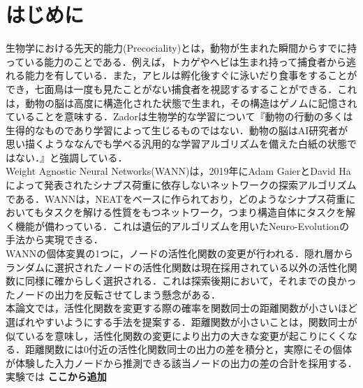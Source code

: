 \section{はじめに}
生物学における先天的能力(Precociality)とは，動物が生まれた瞬間からすでに持っている能力のことである．例えば，トカゲやヘビは生まれ持って捕食者から逃れる能力を有している．また，アヒルは孵化後すぐに泳いだり食事をすることができ，七面鳥は一度も見たことがない捕食者を視認するすることができる．これは，動物の脳は高度に構造化された状態で生まれ，その構造はゲノムに記憶されていることを意味する．Zadorは生物学的な学習について『動物の行動の多くは生得的なものであり学習によって生じるものではない．動物の脳はAI研究者が思い描くようななんでも学べる汎用的な学習アルゴリズムを備えた白紙の状態ではない．』と強調している\cite{先天的能力}．\\
Weight Agnostic Neural Networks(WANN)は，2019年にAdam GaierとDavid Haによって発表されたシナプス荷重に依存しないネットワークの探索アルゴリズムである\cite{WANN}．WANNは，NEAT\cite{NEAT}をベースに作られており，どのようなシナプス荷重においてもタスクを解ける性質をもつネットワーク，つまり構造自体にタスクを解く機能が備わっている．これは遺伝的アルゴリズム\cite{遺伝的アルゴリズム}を用いたNeuro-Evolution\cite{NE}の手法から実現できる．\\
WANNの個体変異の1つに，ノードの活性化関数の変更が行われる．隠れ層からランダムに選択されたノードの活性化関数は現在採用されている以外の活性化関数に同様に確からしく選択される．これは探索後期において，それまでの良かったノードの出力を反転させてしまう懸念がある．\\
本論文では，活性化関数を変更する際の確率を関数同士の距離関数が小さいほど選ばれやすいようにする手法を提案する．距離関数が小さいことは，関数同士が似ているを意味し，活性化関数の変更により出力の大きな変更が起こりにくくなる．距離関数には0付近の活性化関数同士の出力の差を積分と，実際にその個体が体験した入力ノードから推測できる該当ノードの出力の差の合計を採用する．\\
実験では \textbf{ここから追加}